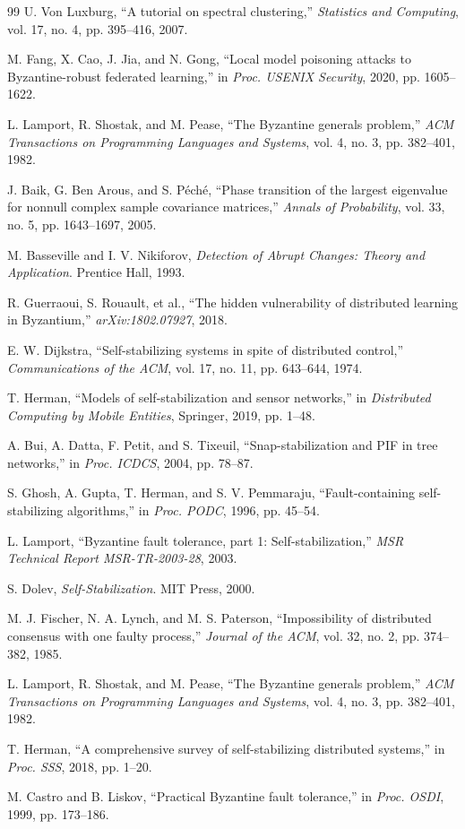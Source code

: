 \documentclass[runningheads]{llncs}
\begin{document}
\begin{thebibliography}{99}
 U. Von Luxburg, ``A tutorial on spectral clustering,'' \textit{Statistics and Computing}, vol. 17, no. 4, pp. 395--416, 2007.

 M. Fang, X. Cao, J. Jia, and N. Gong, ``Local model poisoning attacks to Byzantine-robust federated learning,'' in \textit{Proc. USENIX Security}, 2020, pp. 1605--1622.

 L. Lamport, R. Shostak, and M. Pease, ``The Byzantine generals problem,'' \textit{ACM Transactions on Programming Languages and Systems}, vol. 4, no. 3, pp. 382--401, 1982.

 J. Baik, G. Ben Arous, and S. Péché, ``Phase transition of the largest eigenvalue for nonnull complex sample covariance matrices,'' \textit{Annals of Probability}, vol. 33, no. 5, pp. 1643--1697, 2005.

 M. Basseville and I. V. Nikiforov, \textit{Detection of Abrupt Changes: Theory and Application}. Prentice Hall, 1993.

 R. Guerraoui, S. Rouault, et al., ``The hidden vulnerability of distributed learning in Byzantium,'' \textit{arXiv:1802.07927}, 2018.

 E. W. Dijkstra, ``Self-stabilizing systems in spite of distributed control,'' \textit{Communications of the ACM}, vol. 17, no. 11, pp. 643--644, 1974.

 T. Herman, ``Models of self-stabilization and sensor networks,'' in \textit{Distributed Computing by Mobile Entities}, Springer, 2019, pp. 1--48.

 A. Bui, A. Datta, F. Petit, and S. Tixeuil, ``Snap-stabilization and PIF in tree networks,'' in \textit{Proc. ICDCS}, 2004, pp. 78--87.

 S. Ghosh, A. Gupta, T. Herman, and S. V. Pemmaraju, ``Fault-containing self-stabilizing algorithms,'' in \textit{Proc. PODC}, 1996, pp. 45--54.

 L. Lamport, ``Byzantine fault tolerance, part 1: Self-stabilization,'' \textit{MSR Technical Report MSR-TR-2003-28}, 2003.

 S. Dolev, \textit{Self-Stabilization}. MIT Press, 2000.

 M. J. Fischer, N. A. Lynch, and M. S. Paterson, ``Impossibility of distributed consensus with one faulty process,'' \textit{Journal of the ACM}, vol. 32, no. 2, pp. 374--382, 1985.

 L. Lamport, R. Shostak, and M. Pease, ``The Byzantine generals problem,'' \textit{ACM Transactions on Programming Languages and Systems}, vol. 4, no. 3, pp. 382--401, 1982.

 T. Herman, ``A comprehensive survey of self-stabilizing distributed systems,'' in \textit{Proc. SSS}, 2018, pp. 1--20.

 M. Castro and B. Liskov, ``Practical Byzantine fault tolerance,'' in \textit{Proc. OSDI}, 1999, pp. 173--186.
\end{thebibliography}
\end{document}
